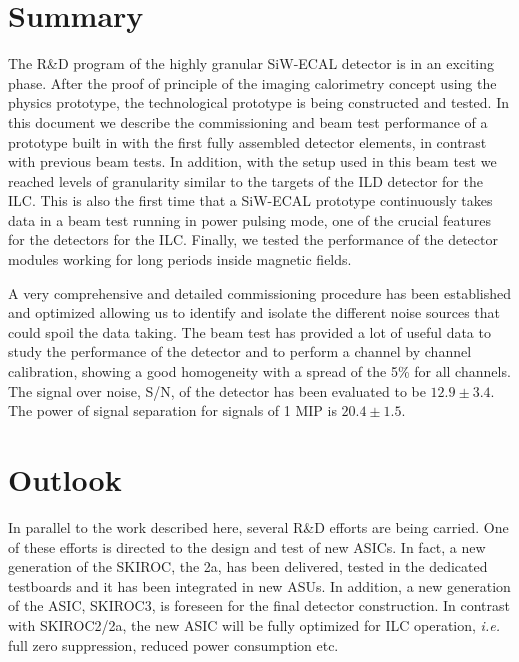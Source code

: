 \documentclass[a4paper,11pt]{article}
\begin{document}
\section{Summary}
\label{sec:summary}

The R\&D program of the highly granular SiW-ECAL detector is in an exciting phase. 
After the proof of principle of the imaging calorimetry concept using the physics prototype, the 
technological prototype is being constructed and tested. In this document we describe the commissioning and
beam test performance of a prototype built in with the first fully assembled
detector elements, in contrast with previous beam tests. In addition,
with the setup used in this beam test we reached levels of granularity
similar to the targets of the ILD detector for the ILC. This is also the first time
that a SiW-ECAL prototype continuously takes data in a beam test running in power pulsing mode, one of the crucial
features for the detectors for the ILC. Finally, we tested the performance of the detector
modules working for long periods inside magnetic fields.

A very comprehensive and detailed commissioning procedure has been established and optimized
allowing us to identify and isolate the different noise sources that could spoil the data taking.
The beam test has provided a lot of useful data to study 
the performance of the detector and to perform
a channel by channel calibration, showing a good homogeneity with a spread of the 5\% for all channels.
The signal over noise, S/N, of the detector has been evaluated to be $12.9\pm3.4$.
The power of signal separation for signals of 1 MIP is $20.4\pm1.5$.

\section{Outlook}
\label{sec:outlook}

In parallel to the work described here, several R\&D efforts are being carried.
One of these efforts is directed to the design and test of new ASICs.
In fact, a new generation of the SKIROC, the 2a, has been delivered, tested in the dedicated testboards
and it has been integrated in new ASUs.
In addition, a new generation of the ASIC, SKIROC3, is foreseen for the final detector construction.
In contrast with SKIROC2/2a, the new ASIC will be fully optimized for ILC operation, {\it i.e.} full zero suppression, reduced power consumption etc.
\end{document}
